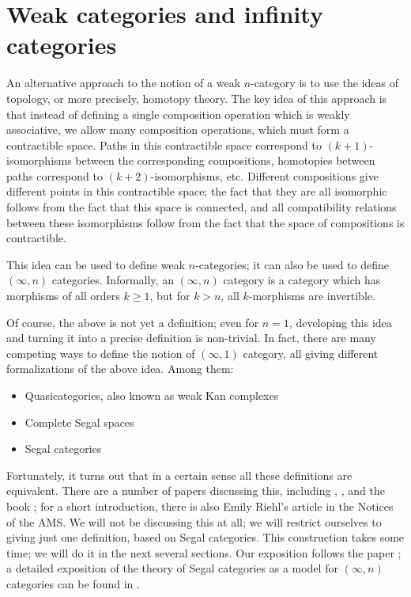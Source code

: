 
\section{Weak categories and infinity categories}\label{s:infinity-categories}

An alternative approach to the notion of a weak $n$-category is to use the
ideas of topology, or more precisely, homotopy theory. The key idea of this
approach is that instead of defining a single composition operation which is
weakly associative, we allow many composition operations, which must form a
contractible space. Paths in this contractible space correspond to
$(k+1)$-isomorphisms between the corresponding compositions, homotopies between
paths correspond to $(k+2)$-isomorphisms, etc. Different compositions give
different points in this contractible space; the fact that they are all
isomorphic follows from the fact that this space is connected, and all
compatibility relations between these isomorphisms follow from the fact that the
space of compositions is contractible.

This idea can be used to define weak $n$-categories; it can also be used to
define $(\infty, n)$ categories. Informally, an $(\infty, n)$ category is a
category which has morphisms of all orders $k \ge 1$, but for $k>n$, all
$k$-morphisms are invertible.


Of course, the above is not yet a definition; even for $n=1$, developing this
idea and turning it into a precise definition is non-trivial. In fact, there are
many competing ways to define the notion of $(\infty, 1)$ category, all giving
different formalizations of the above idea. Among them:

\begin{itemize}
  \item Quasicategories, also known as weak Kan complexes
  \item Complete Segal spaces
  \item Segal categories
\end{itemize}

Fortunately, it turns out that in a certain sense all these definitions are
equivalent. There are a number of papers discussing this, including
, , and the book ; for a short
introduction, there is also Emily Riehl's article  in
the Notices of the AMS. We will not be discussing this at all; we will restrict
ourselves to giving just one definition, based on Segal categories. This
construction takes some time; we will do it in the next several sections. Our
exposition follows the paper ; a detailed exposition of
the theory of Segal categories as a model for $(\infty, n)$ categories can be
found in .



